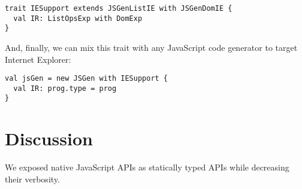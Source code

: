 \documentclass[american,english,runningheads]{llncs}
\begin{document}
\begin{lstlisting}
trait IESupport extends JSGenListIE with JSGenDomIE {
  val IR: ListOpsExp with DomExp
}
\end{lstlisting}

And, finally, we can mix this  trait with any JavaScript code generator to target Internet Explorer:

\begin{lstlisting}
val jsGen = new JSGen with IESupport {
  val IR: prog.type = prog
}
\end{lstlisting}

\section{Discussion}
\label{discussion}

We exposed native JavaScript APIs as statically typed APIs while decreasing their verbosity.



\end{document}

